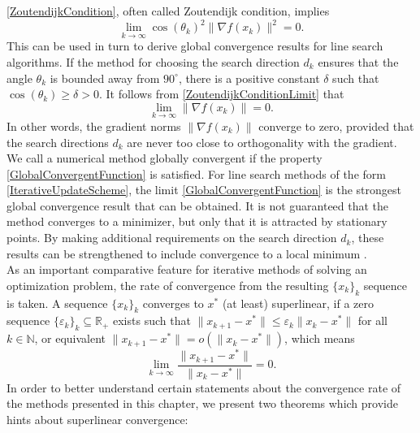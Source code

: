 \cref{ZoutendijkCondition}, often called Zoutendijk condition, implies
\begin{equation}\label{ZoutendijkConditionLimit}
    \lim\limits_{k \to \infty} \cos(\theta_k)^2 \lVert \nabla f(x_k) \rVert^2 = 0.
\end{equation}
This can be used in turn to derive global convergence results for line search algorithms. If the method for choosing the search direction $d_k$ ensures that the angle $\theta_k$ is bounded away from $90^{\circ}$, there is a positive constant $\delta$ such that $\cos(\theta_k) \geq \delta > 0$. It follows from \cref{ZoutendijkConditionLimit} that
\begin{equation}\label{GlobalConvergentFunction}
    \lim\limits_{k \to \infty} \lVert \nabla f(x_k) \rVert = 0.
\end{equation}
In other words, the gradient norms $\lVert \nabla f(x_k) \rVert$ converge to zero, provided that the search directions $d_k$ are never too close to orthogonality with the gradient. \\
We call a numerical method globally convergent if the property \cref{GlobalConvergentFunction} is satisfied. For line search methods of the form \cref{IterativeUpdateScheme}, the limit \cref{GlobalConvergentFunction} is the strongest global convergence result that can be obtained. It is not guaranteed that the method converges to a minimizer, but only that it is attracted by stationary points. By making additional requirements on the search direction $d_k$, these results can be strengthened to include convergence to a local minimum \cite[p.~39-40]{NocedalWright:2006}. \\

As an important comparative feature for iterative methods of solving an optimization problem, the rate of convergence from the resulting $\{ x_k \}_k$ sequence is taken. A sequence $\{ x_k \}_k$ converges to $x^*$ (at least) superlinear, if a zero sequence $\{ \varepsilon_k \}_k \subseteq \mathbb{R}_+$ exists such that $\lVert x_{k+1} - x^* \rVert \leq \varepsilon_k \lVert x_k - x^* \rVert$ for all $k \in \mathbb{N}$, or equivalent $\lVert x_{k+1} - x^* \rVert = o(\lVert x_k - x^* \rVert)$, which means
\begin{equation*}
    \lim\limits_{k \rightarrow \infty} \frac{\lVert x_{k+1} - x^* \rVert}{\lVert x_k - x^* \rVert} = 0.
\end{equation*}
In order to better understand certain statements about the convergence rate of the methods presented in this chapter, we present two theorems which provide hints about superlinear convergence:

